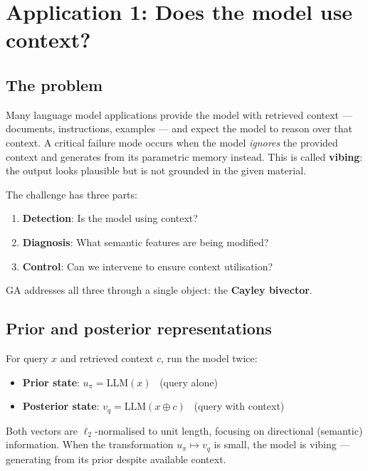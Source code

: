 \documentclass[11pt, twoside, openright]{memoir}
\begin{document}
\section{Application 1: Does the model use context?}
\label{sec:context-detection}

\subsection{The problem}

Many language model applications provide the model with retrieved
context --- documents, instructions, examples --- and expect the
model to reason over that context.  A critical failure mode occurs
when the model \emph{ignores} the provided context and generates
from its parametric memory instead.  This is called \textbf{vibing}:
the output looks plausible but is not grounded in the given material.

The challenge has three parts:
\begin{enumerate}[nosep]
\item \textbf{Detection}: Is the model using context?
\item \textbf{Diagnosis}: What semantic features are being modified?
\item \textbf{Control}: Can we intervene to ensure context utilisation?
\end{enumerate}
GA addresses all three through a single object: the
\textbf{Cayley bivector}.

\subsection{Prior and posterior representations}

For query $x$ and retrieved context $c$, run the model twice:
\begin{itemize}[nosep]
\item \textbf{Prior state}: $u_\pi = \text{LLM}(x)$ \ (query alone)
\item \textbf{Posterior state}: $v_q = \text{LLM}(x \oplus c)$
  \ (query with context)
\end{itemize}
Both vectors are $\ell_2$-normalised to unit length, focusing on
directional (semantic) information.  When the transformation
$u_\pi \mapsto v_q$ is small, the model is vibing --- generating from
its prior despite available context.
\end{document}
